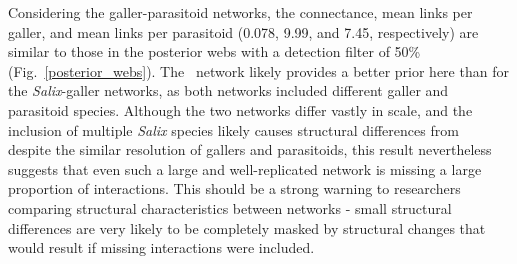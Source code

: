 \documentclass[12pt]{article}
\begin{document}
    Considering the galler-parasitoid networks, the connectance, mean links per galler, and mean links per parasitoid (0.078, 9.99, and 7.45, respectively) are similar to those in the posterior webs with a detection filter of 50\% (Fig.~\ref{posterior_webs}). The~\citet{Barbour2016} network likely provides a better prior here than for the \emph{Salix}-galler networks, as both networks included different galler and parasitoid species. Although the two networks differ vastly in scale, and the inclusion of multiple \emph{Salix} species likely causes structural differences from~\citet{Barbour2016} despite the similar resolution of gallers and parasitoids, this result nevertheless suggests that even such a large and well-replicated network is missing a large proportion of interactions. This should be a strong warning to researchers comparing structural characteristics between networks - small structural differences are very likely to be completely masked by structural changes that would result if missing interactions were included.
\end{document}
